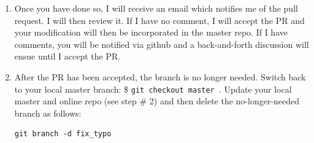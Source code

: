 \begin{enumerate}
\item Once you have done so, I will receive an email which notifies me of the pull request. I will 
then review it. If I have no comment, I will accept the PR and your modification will 
then be incorporated in the master repo. If I have comments, you will be notified via github and a 
back-and-forth discussion will ensue until I accept the PR. 

\item After the PR has been accepted, the branch is no longer needed. Switch back to your local master branch:
\$ \verb"git checkout master ".
Update your local master and online repo (see step \# 2) and then delete the no-longer-needed 
branch as follows:
\begin{verbatim}
git branch -d fix_typo
\end{verbatim}
\end{enumerate}


